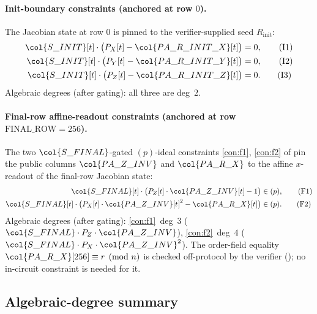 \paragraph{Init-boundary constraints (anchored at row $0$).}

The Jacobian state at row $0$ is pinned to the verifier-supplied
seed $R_{\mathrm{init}}$:
\begin{align}
\col{S\_INIT}[t] \cdot \bigl(P_X[t] - \col{PA\_R\_INIT\_X}[t]\bigr) &= 0,\tag{I1}\label{con:init-x}\\
\col{S\_INIT}[t] \cdot \bigl(P_Y[t] - \col{PA\_R\_INIT\_Y}[t]\bigr) &= 0,\tag{I2}\label{con:init-y}\\
\col{S\_INIT}[t] \cdot \bigl(P_Z[t] - \col{PA\_R\_INIT\_Z}[t]\bigr) &= 0.\tag{I3}\label{con:init-z}
\end{align}
Algebraic degrees (after gating): all three are deg~$2$.

\paragraph{Final-row affine-readout constraints (anchored at row $\mathrm{FINAL\_ROW} = 256$).}

The two $\col{S\_FINAL}$-gated $(p)$-ideal constraints
\ref{con:f1}, \ref{con:f2} of  pin the
public columns $\col{PA\_Z\_INV}$ and $\col{PA\_R\_X}$ to the affine
$x$-readout of the final-row Jacobian state:
\begin{align}
\col{S\_FINAL}[t] \cdot \bigl(P_Z[t] \cdot \col{PA\_Z\_INV}[t] - 1\bigr) &\in (p), \tag{F1}\\
\col{S\_FINAL}[t] \cdot \bigl(P_X[t] \cdot \col{PA\_Z\_INV}[t]^2 - \col{PA\_R\_X}[t]\bigr) &\in (p). \tag{F2}
\end{align}
Algebraic degrees (after gating): \ref{con:f1}~deg~$3$
($\col{S\_FINAL} \cdot P_Z \cdot \col{PA\_Z\_INV}$),
\ref{con:f2}~deg~$4$ ($\col{S\_FINAL} \cdot P_X \cdot \col{PA\_Z\_INV}^2$).
The order-field equality $\col{PA\_R\_X}[256] \equiv r \pmod n$ is
checked off-protocol by the verifier (); no
in-circuit constraint is needed for it.

\subsection{Algebraic-degree summary}\label{sec:degree}

